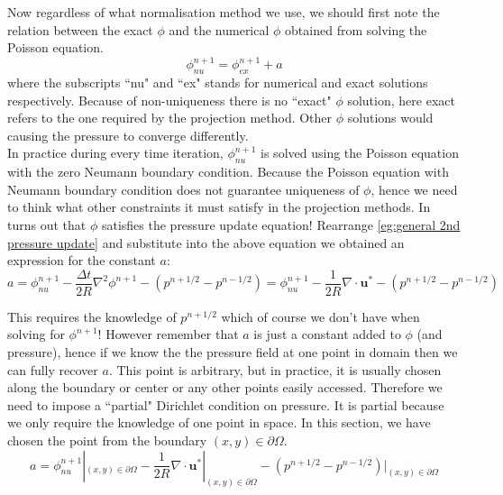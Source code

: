 Now regardless of what normalisation method we use, we should first note the relation between the exact $\phi$ and the numerical $\phi$ obtained from solving the Poisson equation.
\begin{equation}
\phi^{n+1}_{nu} = \phi^{n+1}_{ex} + a
\end{equation}
where the subscripts ``nu" and ``ex" stands for numerical and exact solutions respectively. Because of non-uniqueness there is no ``exact" $\phi$ solution, here exact refers to the one required by the projection method. Other $\phi$ solutions would causing the pressure to converge differently.\\

In practice during every time iteration, $\phi^{n+1}_{nu}$ is solved using the Poisson equation with the zero Neumann boundary condition. Because the Poisson equation with Neumann boundary condition does not guarantee uniqueness of $\phi$, hence we need to think what other constraints it must satisfy in the projection methods. In turns out that $\phi$ satisfies the pressure update equation! Rearrange \eqref{eg:general 2nd pressure update} and substitute into the above equation we obtained an expression for the constant $a$:
\begin{dmath}
a = \phi^{n+1}_{nu} - \dfrac{\Delta t}{2R} \nabla^2 \phi^{n+1} - (p^{n+1/2} - p^{n-1/2})
= \phi^{n+1}_{nu} - \dfrac{1}{2R} \nabla \cdot \textbf{u}^* - (p^{n+1/2} - p^{n-1/2})
\end{dmath}

This requires the knowledge of $p^{n+1/2}$ which of course we don't have when solving for $\phi^{n+1}$! However remember that $a$ is just a constant added to $\phi$ (and pressure), hence if we know the the pressure field at one point in domain then we can fully recover $a$. This point is arbitrary, but in practice, it is usually chosen along the boundary or center or any other points easily accessed. Therefore we need to impose a ``partial" Dirichlet condition on pressure. It is partial because we only require the knowledge of one point in space. In this section, we have chosen the point from the boundary $(x,y) \in \partial \Omega$.\\

\begin{dmath}\label{eq:normalisation constant for Alg 2}
a = \phi^{n+1}_{nu}|_{(x,y)\in \partial\Omega} - \dfrac{1}{2R} \nabla \cdot \textbf{u}^*|_{(x,y)\in \partial\Omega} - (p^{n+1/2} - p^{n-1/2})|_{(x,y)\in \partial\Omega}
\end{dmath}

